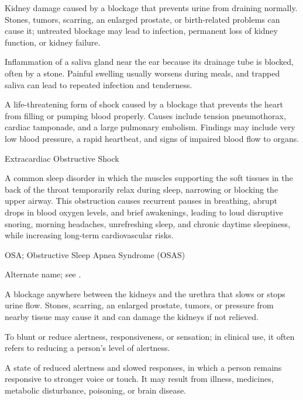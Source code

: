  Kidney damage caused by a blockage that prevents urine from draining normally. Stones, tumors, scarring, an enlarged prostate, or birth-related problems can cause it; untreated blockage may lead to infection, permanent loss of kidney function, or kidney failure.

 Inflammation of a saliva gland near the ear because its drainage tube is blocked, often by a stone. Painful swelling usually worsens during meals, and trapped saliva can lead to repeated infection and tenderness.

 A life-threatening form of shock caused by a blockage that prevents the heart from filling or pumping blood properly. Causes include tension pneumothorax, cardiac tamponade, and a large pulmonary embolism. Findings may include very low blood pressure, a rapid heartbeat, and signs of impaired blood flow to organs.

\synonyms
Extracardiac Obstructive Shock

 A common sleep disorder in which the muscles supporting the soft tissues in the back of the throat temporarily relax during sleep, narrowing or blocking the upper airway. This obstruction causes recurrent pauses in breathing, abrupt drops in blood oxygen levels, and brief awakenings, leading to loud disruptive snoring, morning headaches, unrefreshing sleep, and chronic daytime sleepiness, while increasing long-term cardiovascular risks.

\synonyms
OSA; Obstructive Sleep Apnea Syndrome (OSAS)

 Alternate name; see .

 A blockage anywhere between the kidneys and the urethra that slows or stops urine flow. Stones, scarring, an enlarged prostate, tumors, or pressure from nearby tissue may cause it and can damage the kidneys if not relieved.

 To blunt or reduce alertness, responsiveness, or sensation; in clinical use, it often refers to reducing a person's level of alertness.

 A state of reduced alertness and slowed responses, in which a person remains responsive to stronger voice or touch. It may result from illness, medicines, metabolic disturbance, poisoning, or brain disease.

